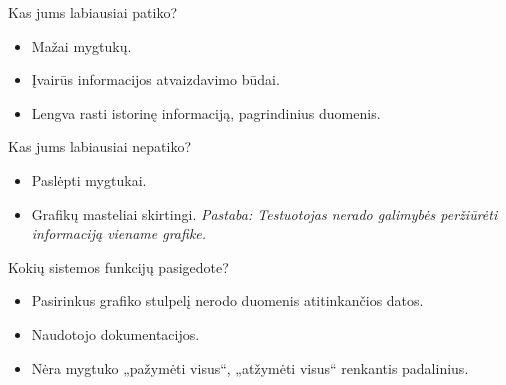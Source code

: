 Kas jums labiausiai patiko?
\begin{itemize}
  \item Mažai mygtukų.
  \item Įvairūs informacijos atvaizdavimo būdai.
  \item Lengva rasti istorinę informaciją, pagrindinius duomenis.
\end{itemize}

Kas jums labiausiai nepatiko?
\begin{itemize}
  \item Paslėpti mygtukai.
  \item Grafikų masteliai skirtingi. \emph{Pastaba: Testuotojas
    nerado galimybės peržiūrėti informaciją viename grafike.}
\end{itemize}

Kokių sistemos funkcijų pasigedote?
\begin{itemize}
  \item Pasirinkus grafiko stulpelį nerodo duomenis atitinkančios datos.
  \item Naudotojo dokumentacijos.
  \item Nėra mygtuko „pažymėti visus“, „atžymėti visus“ renkantis
    padalinius.
\end{itemize}
